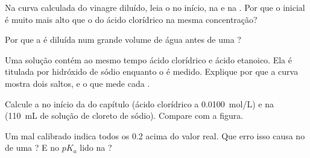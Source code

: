 \begin{exercise}[$\star\star$]\label{exo:g12:ph-conductivity-titrations:10}
Na curva calculada do vinagre diluído, leia o  no início, na
 e na . Por que o  inicial é muito mais
alto que o do ácido clorídrico na mesma concentração?
\end{exercise}

\begin{exercise}[$\star\star$]\label{exo:g12:ph-conductivity-titrations:11}
Por que a  é diluída num grande volume de água antes de
uma ?
\end{exercise}

\begin{exercise}[$\star\star\star$]\label{exo:g12:ph-conductivity-titrations:12}
Uma solução contém ao mesmo tempo ácido clorídrico e ácido etanoico. Ela
é titulada por hidróxido de sódio enquanto o  é medido. Explique por
que a curva mostra dois saltos, e o que mede cada .
\end{exercise}

\begin{exercise}[$\star\star\star$]\label{exo:g12:ph-conductivity-titrations:13}
Calcule a  no início da  do
capítulo (ácido clorídrico a \qty{0.0100}{mol/L}) e na 
(\qty{110}{mL} de solução de cloreto de sódio). Compare com a figura.
\end{exercise}

\begin{exercise}[$\star\star\star$]\label{exo:g12:ph-conductivity-titrations:14}
Um  mal calibrado indica todos os  0.2 acima do valor real.
Que erro isso causa no  de uma ? E no $pK_a$ lido na ?
\end{exercise}

